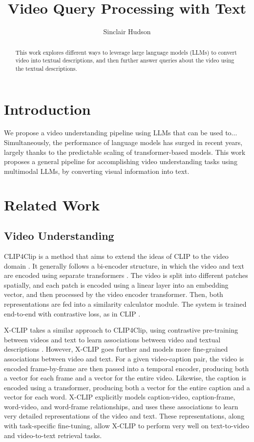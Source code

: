 \documentclass{article}
\title{Video Query Processing with Text}
\author{Sinclair Hudson}
\begin{document}
\maketitle

\begin{abstract}
      This work explores different ways to leverage large language models (LLMs) to convert video into textual descriptions, and then further answer queries about the video using the textual descriptions.
\end{abstract}

\section{Introduction}

We propose a video understanding pipeline using LLMs that can be used to...
Simultaneously, the performance of language models has surged in recent years, largely thanks to the predictable scaling of transformer-based models.
This work proposes a general pipeline for accomplishing video understanding tasks using multimodal LLMs, by converting visual information into text.

\section{Related Work}

\subsection{Video Understanding}

CLIP4Clip is a method that aims to extend the ideas of CLIP \cite{clip} to the video domain \cite{clip4clip}.
It generally follows a bi-encoder structure, in which the video and text are encoded using separate transformers \cite{transformer}.
The video is split into different patches spatially, and each patch is encoded using a linear layer into an embedding vector, and then processed by the video encoder transformer.
Then, both representations are fed into a similarity calculator module.
The system is trained end-to-end with contrastive loss, as in CLIP \cite{clip}.

X-CLIP takes a similar approach to CLIP4Clip, using contrastive pre-training between videos and text to learn associations between video and textual descriptions \cite{xclip}.
However, X-CLIP goes further and models more fine-grained associations between video and text.
For a given video-caption pair, the video is encoded frame-by-frame are then passed into a temporal encoder, producing both a vector for each frame and a vector for the entire video.
Likewise, the caption is encoded using a transformer, producing both a vector for the entire caption and a vector for each word.
X-CLIP explicitly models caption-video, caption-frame, word-video, and word-frame relationships, and uses these associations to learn very detailed representations of the video and text.
These representations, along with task-specific fine-tuning, allow X-CLIP to perform very well on text-to-video and video-to-text retrieval tasks.
\end{document}
